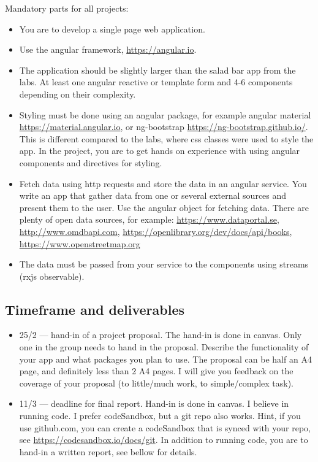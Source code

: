 \documentclass[fleqn, article, a4paper]{memoir}
\begin{document}
\noindent Mandatory parts for all projects:
\begin{itemize}\firmlist
\item You are to develop a single page web application.
\item Use the angular framework, \url{https://angular.io}.
\item The application should be slightly larger than the salad bar app from the labs. At least one angular reactive or template form and 4-6 components depending on their complexity.
\item Styling must be done using an angular package, for example angular material \url{https://material.angular.io}, or ng-bootstrap \url{https://ng-bootstrap.github.io/}. This is different compared to the labs, where css classes were used to style the app. In the project, you are to get hands on experience with using angular components and directives for styling.
\item Fetch data using http requests and store the data in an angular service. You write an app that gather data from one or several external sources and present them to the user. Use the angular  object for fetching data. There are plenty of open data sources, for example: \url{https://www.dataportal.se}, \url{http://www.omdbapi.com}, \url{https://openlibrary.org/dev/docs/api/books}, \url{https://www.openstreetmap.org}
\item The data must be passed from your service to the components using streams (rxjs observable).
\end{itemize}

\subsection*{Timeframe and deliverables}

\begin{itemize}
\item 25/2 --- hand-in of a project proposal. The hand-in is done in canvas. Only one in the group needs to hand in the proposal. Describe the functionality of your app and what packages you plan to use. The proposal can be half an A4 page, and definitely less than 2 A4 pages. I will give you feedback on the coverage of your proposal (to little/much work, to simple/complex task).
\item 11/3 --- deadline for final report. Hand-in is done in canvas. I believe in running code. I prefer codeSandbox, but a git repo also works. Hint, if you use github.com, you can create a codeSandbox that is synced with your repo, see \url{https://codesandbox.io/docs/git}. In addition to running code, you are to hand-in a written report, see bellow for details.
\end{itemize}
\end{document}
